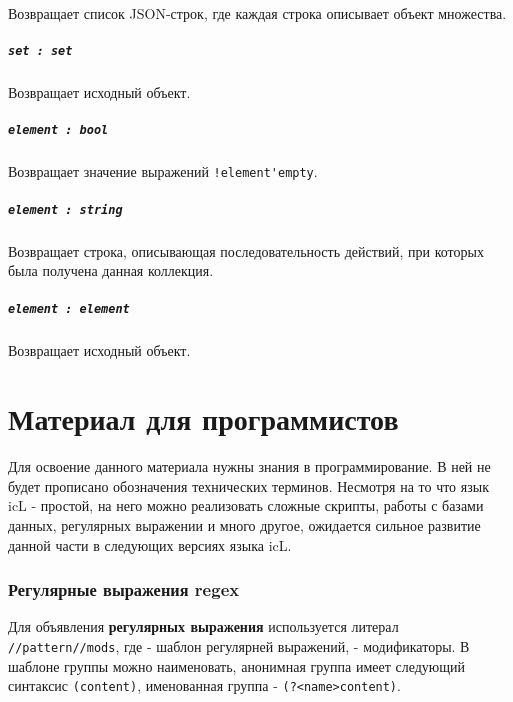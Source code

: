 \documentclass[a4paper, 14pt]{extarticle}
\begin{document}
Возвращает список JSON-строк, где каждая строка описывает объект множества.

\subsubsection{\lstinline|set : set|}

Возвращает исходный объект.

\subsubsection{\lstinline|element : bool|}

Возвращает значение выражений \lstinline|!element'empty|.

\subsubsection{\lstinline|element : string|}

Возвращает строка, описывающая последовательность действий, при которых была получена данная коллекция.

\subsubsection{\lstinline|element : element|}

Возвращает исходный объект.

\newpage
\part{Материал для программистов}

Для освоение данного материала нужны знания в программирование. В ней не будет прописано обозначения технических терминов. Несмотря на то что язык icL - простой, на него можно реализовать сложные скрипты, работы с базами данных, регулярных выражении и много другое, ожидается сильное развитие данной части в следующих версиях языка icL.

\section{Регулярные выражения {\color{bluemarin} regex}}
\label{regex}

Для объявления {\bf регулярных выражения} используется литерал \lstinline|//pattern//mods|, где  - шаблон регулярней выражений,  - модификаторы. В шаблоне группы можно наименовать, анонимная группа имеет следующий синтаксис \lstinline|(content)|, именованная группа - \lstinline|(?<name>content)|.
\end{document}
